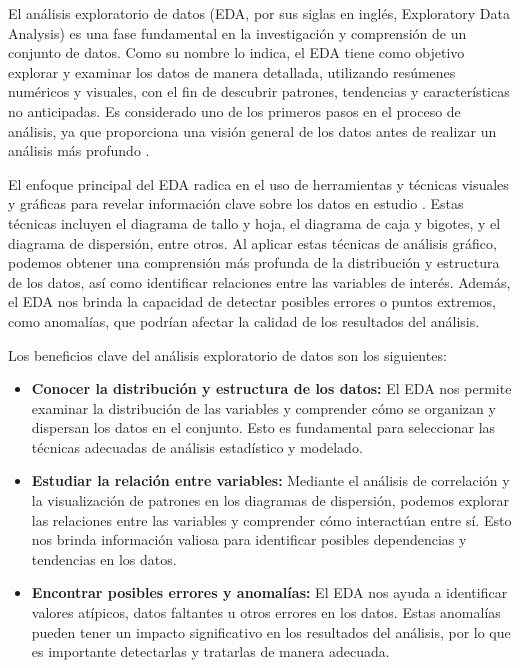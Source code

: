 El análisis exploratorio de datos (EDA, por sus siglas en inglés, Exploratory Data Analysis) es una fase fundamental en la investigación y comprensión de un conjunto de datos. Como su nombre lo indica, el EDA tiene como objetivo explorar y examinar los datos de manera detallada, utilizando resúmenes numéricos y visuales, con el fin de descubrir patrones, tendencias y características no anticipadas. Es considerado uno de los primeros pasos en el proceso de análisis, ya que proporciona una visión general de los datos antes de realizar un análisis más profundo \cite{ruiz2022exploratorio}.

El enfoque principal del EDA radica en el uso de herramientas y técnicas visuales y gráficas para revelar información clave sobre los datos en estudio \cite{parra2002exploratorio}. Estas técnicas incluyen el diagrama de tallo y hoja, el diagrama de caja y bigotes, y el diagrama de dispersión, entre otros. Al aplicar estas técnicas de análisis gráfico, podemos obtener una comprensión más profunda de la distribución y estructura de los datos, así como identificar relaciones entre las variables de interés. Además, el EDA nos brinda la capacidad de detectar posibles errores o puntos extremos, como anomalías, que podrían afectar la calidad de los resultados del análisis.

Los beneficios clave del análisis exploratorio de datos son los siguientes:
\begin{itemize}
    \item \textbf{Conocer la distribución y estructura de los datos:} El EDA nos permite examinar la distribución de las variables y comprender cómo se organizan y dispersan los datos en el conjunto. Esto es fundamental para seleccionar las técnicas adecuadas de análisis estadístico y modelado.
    \item \textbf{Estudiar la relación entre variables:} Mediante el análisis de correlación y la visualización de patrones en los diagramas de dispersión, podemos explorar las relaciones entre las variables y comprender cómo interactúan entre sí. Esto nos brinda información valiosa para identificar posibles dependencias y tendencias en los datos.
    \item \textbf{Encontrar posibles errores y anomalías:} El EDA nos ayuda a identificar valores atípicos, datos faltantes u otros errores en los datos. Estas anomalías pueden tener un impacto significativo en los resultados del análisis, por lo que es importante detectarlas y tratarlas de manera adecuada.
\end{itemize}